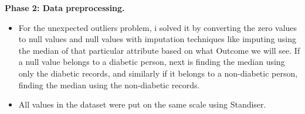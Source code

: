 \documentclass[11pt]{article}
\begin{document}
\textbf{Phase 2: Data preprocessing.}
\begin{itemize}
	\item For the unexpected outliers problem, i solved it by converting the zero values to null values and null values with imputation techniques like imputing using the median of that particular attribute based on what Outcome we will see. If a null value belongs to a diabetic person, next is finding the median using only the diabetic records, and similarly if it belongs to a non-diabetic person, finding the median using the non-diabetic records.\\
	\item All values in the dataset were put on the same scale using Standiser.\\
	
	
	
\end{itemize}
\end{document}
